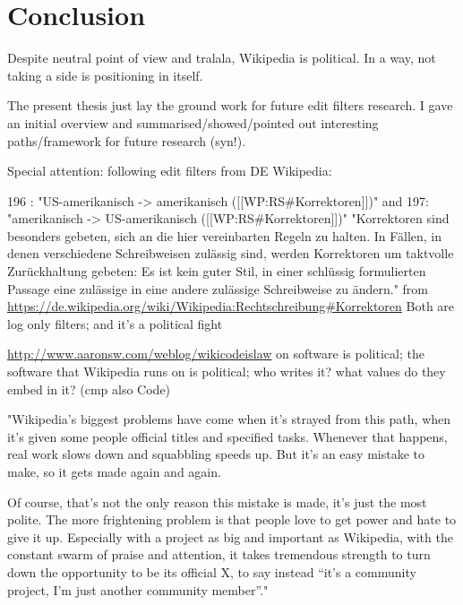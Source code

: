 %
\chapter{Conclusion}
\label{chap:conclusion}

Despite neutral point of view and tralala, Wikipedia is political.
In a way, not taking a side is positioning in itself.

The present thesis just lay the ground work for future edit filters research.
I gave an initial overview and summarised/showed/pointed out interesting paths/framework for future research (syn!).

Special attention: following edit filters from DE Wikipedia:

196 : "US-amerikanisch -> amerikanisch ([[WP:RS\#Korrektoren]])"
and 197: "amerikanisch -> US-amerikanisch ([[WP:RS\#Korrektoren]])"
"Korrektoren sind besonders gebeten, sich an die hier vereinbarten Regeln zu halten. In Fällen, in denen verschiedene Schreibweisen zulässig sind, werden Korrektoren um taktvolle Zurückhaltung gebeten: Es ist kein guter Stil, in einer schlüssig formulierten Passage eine zulässige in eine andere zulässige Schreibweise zu ändern." from \url{https://de.wikipedia.org/wiki/Wikipedia:Rechtschreibung#Korrektoren}
Both are log only filters;
and it's a political fight

\url{http://www.aaronsw.com/weblog/wikicodeislaw}
on software is political; the software that Wikipedia runs on is political; who writes it? what values do they embed in it? (cmp also Code)

"Wikipedia’s biggest problems have come when it’s strayed from this path, when it’s given some people official titles and specified tasks. Whenever that happens, real work slows down and squabbling speeds up. But it’s an easy mistake to make, so it gets made again and again.

Of course, that’s not the only reason this mistake is made, it’s just the most polite. The more frightening problem is that people love to get power and hate to give it up. Especially with a project as big and important as Wikipedia, with the constant swarm of praise and attention, it takes tremendous strength to turn down the opportunity to be its official X, to say instead “it’s a community project, I’m just another community member”."

